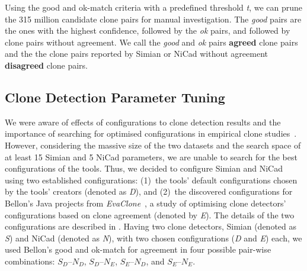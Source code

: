 \documentclass[sigconf,review, anonymous]{acmart}
\begin{document}
Using the good and ok-match criteria with a predefined threshold
\textit{t}, we can prune the 315 million candidate clone pairs for
manual investigation. The \textit{good} pairs are the ones with the
highest confidence, followed by the \textit{ok} pairs, and followed by
clone pairs without agreement. We call the \textit{good} and
\textit{ok} pairs \textbf{agreed} clone pairs and the the clone pairs
reported by Simian or NiCad without agreement \textbf{disagreed} clone
pairs.

\subsection{Clone Detection Parameter Tuning}

We were aware of effects of configurations to clone detection results
and the importance of searching for optimised configurations in
empirical clone
studies~\cite{Svajlenko2014,Wang2014,cr2016ssbse,Ragkhitwetsagul2016}. However,
considering the massive size of the two datasets and the search space
of at least 15 Simian and 5 NiCad parameters, we are unable to search
for the best configurations of the tools. Thus, we decided to
configure Simian and NiCad using two established configurations:
(1)~the tools' default configurations chosen by the tools' creators
(denoted as \textit{D}), and (2)~the discovered configurations for
Bellon's Java projects from \textit{EvaClone}~\cite{Wang2013}, a study
of optimising clone detectors' configurations based on clone agreement
(denoted by \textit{E}). The details of the two configurations are
described in . Having two clone detectors, Simian
(denoted as \textit{S}) and NiCad (denoted as \textit{N}), with two
chosen configurations (\textit{D} and \textit{E}) each, we used
Bellon's good and ok-match for agreement in four possible pair-wise
combinations: $S_{D}$--$N_{D}$, $S_{D}$--$N_{E}$, $S_{E}$--$N_{D}$,
and $S_{E}$--$N_{E}$.
\end{document}
